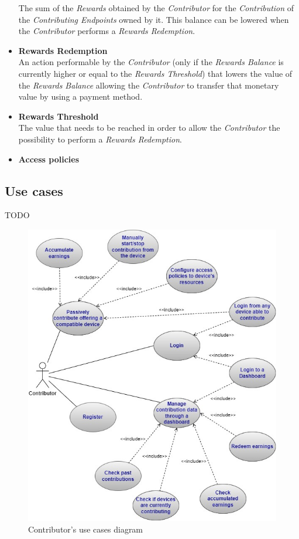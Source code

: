 \begin{itemize}
    The sum of the \textit{Rewards} obtained by the \textit{Contributor} for the \textit{Contribution} of the \textit{Contributing Endpoints} owned by it. This balance can be lowered when the \textit{Contributor} performs a \textit{Rewards Redemption}. 
    \item \textbf{Rewards Redemption}\label{rewards_redemption}\\
    An action performable by the \textit{Contributor} (only if the \textit{Rewards Balance} is currently higher or equal to the \textit{Rewards Threshold}) that lowers the value of the \textit{Rewards Balance} allowing the \textit{Contributor} to transfer that monetary value by using a payment method.
    \item \textbf{Rewards Threshold}\label{rewards_threshold}\\
    The value that needs to be reached in order to allow the \textit{Contributor} the possibility to perform a \textit{Rewards Redemption}.
    \item \textbf{Access policies}\label{access_policies}\\
\end{itemize}

\subsection{Use cases}
TODO

\begin{figure}[!ht]
    \centering
    \includegraphics[width=\linewidth]{document/chapters/chapter_5/images/contributor_use_cases.jpg}
    \caption{Contributor's use cases diagram}
    \label{fig:use_cases_contributor}
\end{figure}


